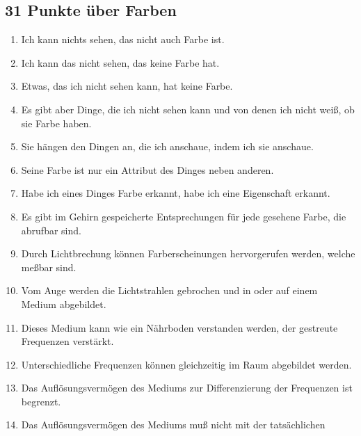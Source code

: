 \documentclass[
]{article}
\author{}
\date{\vspace{-2.5em}}
\providecommand{\tightlist}{%
  \setlength{\itemsep}{0pt}\setlength{\parskip}{0pt}}
\begin{document}
\subsection{31 Punkte über Farben}\label{punkte-uxfcber-farben}

\begin{enumerate}
\def\labelenumi{\arabic{enumi}.}
\setcounter{enumi}{3}
\tightlist
\item
  Ich kann nichts sehen, das nicht auch Farbe ist.\\
\item
  Ich kann das nicht sehen, das keine Farbe hat.\\
\item
  Etwas, das ich nicht sehen kann, hat keine Farbe.\\
\item
  Es gibt aber Dinge, die ich nicht sehen kann und von denen ich nicht
  weiß, ob sie Farbe haben.\\
\item
  Sie hängen den Dingen an, die ich anschaue, indem ich sie anschaue.\\
\item
  Seine Farbe ist nur ein Attribut des Dinges neben anderen.\\
\item
  Habe ich eines Dinges Farbe erkannt, habe ich eine Eigenschaft
  erkannt.\\
\item
  Es gibt im Gehirn gespeicherte Entsprechungen für jede gesehene Farbe,
  die abrufbar sind.\\
\item
  Durch Lichtbrechung können Farberscheinungen hervorgerufen werden,
  welche meßbar sind.\\
\item
  Vom Auge werden die Lichtstrahlen gebrochen und in oder auf einem
  Medium abgebildet.\\
\item
  Dieses Medium kann wie ein Nährboden verstanden werden, der gestreute
  Frequenzen verstärkt.\\
\item
  Unterschiedliche Frequenzen können gleichzeitig im Raum abgebildet
  werden.\\
\item
  Das Auflösungsvermögen des Mediums zur Differenzierung der Frequenzen
  ist begrenzt.\\
\item
  Das Auflösungsvermögen des Mediums muß nicht mit der tatsächlichen

\end{enumerate}
\end{document}
